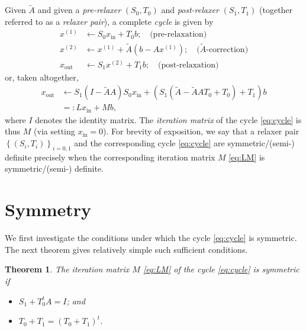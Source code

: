 \documentclass{article}
\newtheorem{theorem}{Theorem}
\begin{document}
Given $\widetilde{A}$ and given a \emph{pre-relaxer} $\left( S_0, T_0 \right)$ and \emph{post-relaxer} $\left( S_1, T_1 \right)$ (together referred to as a \emph{relaxer pair}), a complete \emph{cycle} is given by
\begin{equation} \label{eq:cycle}
\begin{split}
x^{(1)} & \leftarrow S_0 x_{\text{in}} + T_0 b; \quad \text{(pre-relaxation)} \\
x^{(2)} & \leftarrow x^{(1)} + \widetilde{A} \left( b - A x^{(1)} \right); \quad \text{($\widetilde{A}$-correction)} \\
x_{\text{out}} & \leftarrow S_1 x^{(2)} + T_1 b; \quad \text{(post-relaxation)}
\end{split}
\end{equation}
or, taken altogether,
\begin{subequations} \label{eq:LM}
\begin{align}
x_{\text{out}}
  & \leftarrow S_1 \left( I - \widetilde{A} A \right) S_0 x_{\text{in}} + \left( S_1 \left( \widetilde{A} - \widetilde{A} A T_0 + T_0 \right) + T_1 \right) b \\
  & =: L x_{\text{in}} + M b,
\end{align}
\end{subequations}
where $I$ denotes the identity matrix. The \emph{iteration matrix} of the cycle \eqref{eq:cycle} is thus $M$ (via setting $x_{\text{in}} = 0$). For brevity of exposition, we say that a relaxer pair $\left\{ \left( S_i, T_i \right) \right\}_{i = 0,1}$ and the corresponding cycle \eqref{eq:cycle} are symmetric/(semi-) definite precisely when the corresponding iteration matrix $M$ \eqref{eq:LM} is symmetric/(semi-) definite.

\section{Symmetry}

We first investigate the conditions under which the cycle \eqref{eq:cycle} is symmetric. The next theorem gives relatively simple such sufficient conditions.

\begin{theorem} \label{thm:symmetry}
The iteration matrix $M$ \eqref{eq:LM} of the cycle \eqref{eq:cycle} is symmetric if
\begin{itemize}
\item[(S0)] $S_1 + T_0^t A = I$; and
\item[(S1)] $T_0 + T_1 = \left( T_0 + T_1 \right)^t$.
\end{itemize}
\end{theorem}
\end{document}
